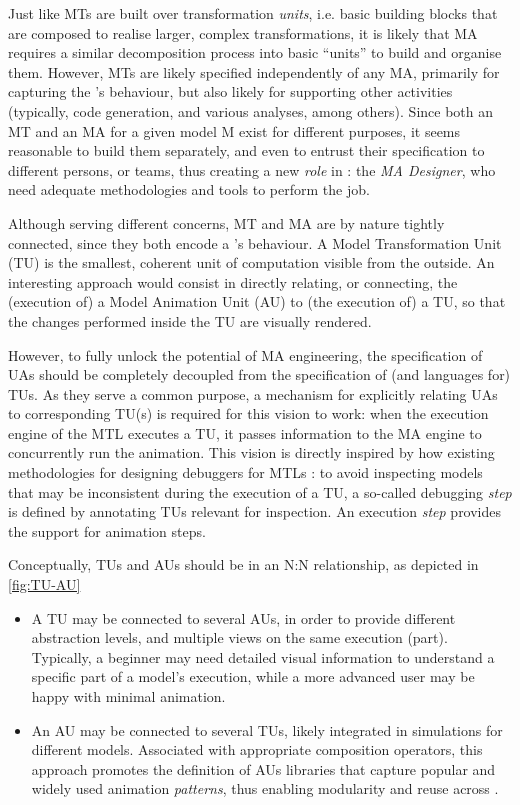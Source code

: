 Just like MTs are built over transformation \emph{units}, i.e. basic building blocks
that are composed to realise larger, complex transformations, it is likely that 
MA requires a similar decomposition process into basic ``units'' to build and 
organise them. However, MTs are likely specified independently of any MA, primarily
for capturing the \DSL's behaviour, but also likely for supporting other activities
(typically, code generation, and various analyses, among others). Since both an MT
and an MA for a given model \textsf{M} exist for different purposes, it seems 
reasonable to build them separately, and even to entrust their specification to
different persons, or teams, thus creating a new \emph{role} in \MDE: the 
\emph{MA Designer}, who need adequate methodologies and tools to perform the job.

Although serving different concerns, MT and MA are by nature tightly connected,
since they both encode a \DSL's behaviour. A Model Transformation Unit (TU) is the
smallest, coherent unit of computation visible from the outside. An interesting
approach would consist in directly relating, or connecting, the (execution of) a
Model Animation Unit (AU) to (the execution of) a TU, so that the changes performed
inside the TU are visually rendered. 

However, to fully unlock the potential of MA engineering, the specification of UAs
should be completely decoupled from the specification of (and languages for) TUs.
As they serve a common purpose, a mechanism for explicitly relating UAs to corresponding
TU(s) is required for this vision to work: when the execution engine of the MTL
executes a TU, it passes information to the MA engine to concurrently run the
animation. This vision is directly inspired by how existing methodologies for designing 
debuggers for MTLs \citep{bousse2018omniscient,J:VanMierlo-Vangheluwe-etAl:2020}:
to avoid inspecting models that may be inconsistent during the execution of a TU,
a so-called debugging \emph{step} is defined by annotating TUs relevant for inspection.
An execution \emph{step} provides the support for animation steps.

Conceptually, TUs and AUs should be in an \textsf{N:N} relationship, as depicted
in \autoref{fig:TU-AU}
\begin{itemize}
	\item A TU may be connected to several AUs, in order to provide different abstraction
   levels, and multiple views on the same execution (part). Typically, a beginner
   may need detailed visual information to understand a specific part of a model's
   execution, while a more advanced user may be happy with minimal animation.

   \item An AU may be connected to several TUs, likely integrated in simulations
   for different models. Associated with appropriate composition operators, this
   approach promotes the definition of AUs libraries that capture popular and 
   widely used animation \emph{patterns}, thus enabling modularity and reuse 
   across \DSLs.
\end{itemize}

